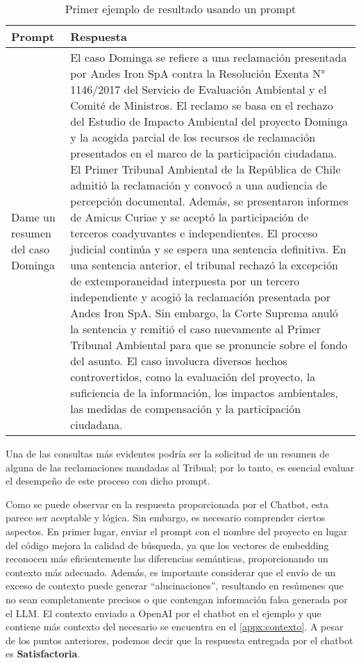 \begin{table}[ht!]
    \centering
    \caption[Ejemplo: Primer Prompt]{Primer ejemplo de resultado usando un prompt}
    \begin{tabular}{p{3cm}p{12cm}}
        \toprule
        \textbf{Prompt} & \textbf{Respuesta} \\
        \hline\hline
        Dame un resumen del caso Dominga & El caso Dominga se refiere a una reclamación presentada por Andes Iron SpA contra la Resolución Exenta N° 1146/2017 del Servicio de Evaluación Ambiental y el Comité de Ministros. El reclamo se basa en el rechazo del Estudio de Impacto Ambiental del proyecto Dominga y la acogida parcial de los recursos de reclamación presentados en el marco de la participación ciudadana. El Primer Tribunal Ambiental de la República de Chile admitió la reclamación y convocó a una audiencia de percepción documental. Además, se presentaron informes de Amicus Curiae y se aceptó la participación de terceros coadyuvantes e independientes. El proceso judicial continúa y se espera una sentencia definitiva. En una sentencia anterior, el tribunal rechazó la excepción de extemporaneidad interpuesta por un tercero independiente y acogió la reclamación presentada por Andes Iron SpA. Sin embargo, la Corte Suprema anuló la sentencia y remitió el caso nuevamente al Primer Tribunal Ambiental para que se pronuncie sobre el fondo del asunto. El caso involucra diversos hechos controvertidos, como la evaluación del proyecto, la suficiencia de la información, los impactos ambientales, las medidas de compensación y la participación ciudadana.  \\
        \bottomrule
    \end{tabular}
    \label{tb1:prompt1}
\end{table}

Una de las consultas más evidentes podría ser la solicitud de un resumen de alguna de las reclamaciones mandadas al Tribual; por lo tanto, 
es esencial evaluar el desempeño de este proceso con dicho prompt.

Como se puede observar en la respuesta proporcionada por el Chatbot, esta parece ser aceptable y lógica. Sin embargo, es necesario comprender 
ciertos aspectos. En primer lugar, enviar el prompt con el nombre del proyecto en lugar del código mejora la calidad de búsqueda, ya que los 
vectores de embedding reconocen más eficientemente las diferencias semánticas, proporcionando un contexto más adecuado. Además, es importante 
considerar que el envío de un exceso de contexto puede generar ``alucinaciones'', resultando en resúmenes que no sean completamente precisos o que 
contengan información falsa generada por el LLM. El contexto enviado a OpenAI por el chatbot en el ejemplo y que contiene más contexto del necesario
 se encuentra en el \autoref{appx:contexto}. A pesar de los puntos anteriores, podemos decir que la respuesta entregada por el chatbot es \textbf{Satisfactoria}.

